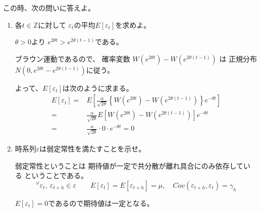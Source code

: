 \documentclass[12pt,b5paper]{ltjsarticle}
\begin{document}
\begin{enumerate}
      この時、次の問いに答えよ。
      \begin{enumerate}
       \item 各$t\in\mathbb{Z}$に対して
             $\varepsilon_{t}$の平均$E[\varepsilon_{t}]$を求めよ。

             \dotfill

             $\theta>0$より
             $e^{2\theta t}>e^{2\theta (t-1)}$である。
             
             ブラウン運動であるので、
             確率変数
             $W \left( e^{2\theta t} \right)- W \left( e^{2\theta (t-1)} \right)$
             は
             正規分布$N(0,e^{2\theta t}-e^{2\theta (t-1)})$に従う。

             よって、$E[\varepsilon_t]$は次のように求まる。
             \begin{align}
              E[\varepsilon_{t}] =&
              E\left[
              \frac{\alpha}{\sqrt{2\theta}} \left\{
              W \left( e^{2\theta t} \right)
              - W \left( e^{2\theta (t-1)} \right)
              \right\}
              e^{-\theta t}
              \right]\\
              =&
              \frac{\alpha}{\sqrt{2\theta}}
              E\left[
              W \left( e^{2\theta t} \right)
              - W \left( e^{2\theta (t-1)} \right)
              \right]
              e^{-\theta t}\\
              =&
              \frac{\alpha}{\sqrt{2\theta}}\cdot 0 \cdot e^{-\theta t}
              =0
             \end{align}


             \hrulefill

       \item 時系列$\varepsilon$は弱定常性を満たすことを示せ。

             \dotfill

             弱定常性ということは
             期待値が一定で共分散が離れ具合にのみ依存している
             ということである。
             \begin{equation}
              {}^{\forall}\varepsilon_t,\ \varepsilon_{t+h}\in \varepsilon
               \qquad
               E[\varepsilon_t]=E[\varepsilon_{t+h}]=\mu
               ,\quad
               Cov(\varepsilon_{t+h},\varepsilon_t)=\gamma_h
             \end{equation}

             $E[\varepsilon_{t}]=0$であるので期待値は一定となる。


\end{enumerate}
\end{enumerate}
\end{document}
